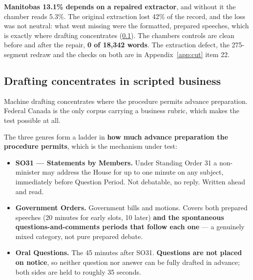 \textbf{Manitoba\textquotesingle s 13.1\% depends on a repaired extractor}, and without it the
chamber reads 5.3\%. The original extraction lost 42\% of the record, and the
loss was not neutral: what went missing were the formatted, prepared speeches,
which is exactly where drafting concentrates (\cref{sec:genre}). The chamber\textquotesingle s controls are
clean before and after the repair, \textbf{0 of 18,342 words}. The extraction
defect, the 275-segment redraw and the checks on both are in Appendix~\ref{app:cut} item
22.

\subsection{Drafting concentrates in scripted business}\label{sec:genre}

Machine drafting concentrates where the procedure permits advance
preparation. Federal Canada is the only corpus carrying a business rubric,
which makes the test possible at all.

The three genres form a ladder in \textbf{how much advance preparation the
procedure permits}, which is the mechanism under test:

\begin{itemize}
\tightlist
\item
  \textbf{SO31 --- Statements by Members.} Under Standing Order 31 a non-minister
  may address the House for up to one minute on any subject, immediately
  before Question Period. Not debatable, no reply. Written ahead and read.
\item
  \textbf{Government Orders.} Government bills and motions. Covers both prepared
  speeches (20 minutes for early slots, 10 later) \textbf{and the spontaneous
  questions-and-comments periods that follow each one} --- a genuinely mixed
  category, not pure prepared debate.
\item
  \textbf{Oral Questions.} The 45 minutes after SO31. \textbf{Questions are not placed
  on notice}, so neither question nor answer can be fully drafted in
  advance; both sides are held to roughly 35 seconds.
\end{itemize}

